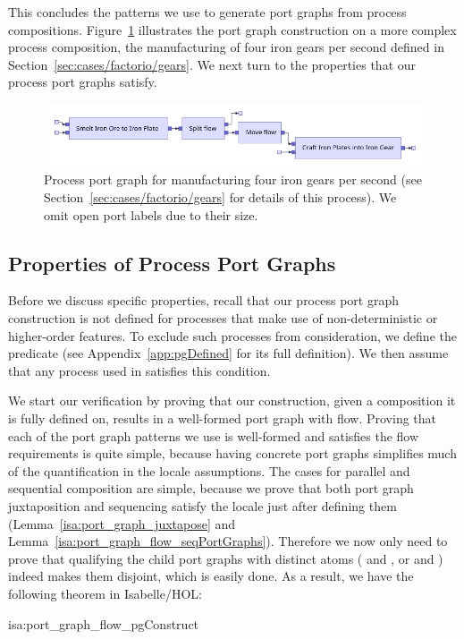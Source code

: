 \documentclass[class=smolathesis,crop=false]{standalone}
\begin{document}
This concludes the patterns we use to generate port graphs from process compositions.
Figure~\ref{fig:fourGears_port_graph} illustrates the port graph construction on a more complex process composition, the manufacturing of four iron gears per second defined in Section~\ref{sec:cases/factorio/gears}.
We next turn to the properties that our process port graphs satisfy.

\begin{figure}[htbp]
  \centering
  \includegraphics[scale=0.5]{img/fourGears_port_graph.png}
  \caption{Process port graph for manufacturing four iron gears per second (see Section~\ref{sec:cases/factorio/gears} for details of this process). We omit open port labels due to their size.}
  \label{fig:fourGears_port_graph}
\end{figure}

\subsection{Properties of Process Port Graphs}
\label{sec:port_graphs/process/prop}

Before we discuss specific properties, recall that our process port graph construction is not defined for processes that make use of non-deterministic or higher-order features.
\cbstart
To exclude such processes from consideration, we define the predicate  (see Appendix~\ref{app:pgDefined} for its full definition).
We then assume that any process used in  satisfies this condition.
\cbend

We start our verification by proving that our construction, given a composition it is fully defined on, results in a well-formed port graph with flow.
Proving that each of the port graph patterns we use is well-formed and satisfies the flow requirements is quite simple, because having concrete port graphs simplifies much of the quantification in the locale assumptions.
The cases for parallel and sequential composition are simple, because we prove that both port graph juxtaposition and sequencing satisfy the  locale just after defining them (Lemma~\ref{isa:port_graph_juxtapose} and Lemma~\ref{isa:port_graph_flow_seqPortGraphs}).
Therefore we now only need to prove that qualifying the child port graphs with distinct atoms ( and , or  and ) indeed makes them disjoint, which is easily done.
As a result, we have the following theorem in Isabelle/HOL:
\begin{isalemma}{isa:port_graph_flow_pgConstruct}
  
\end{isalemma}
\end{document}
